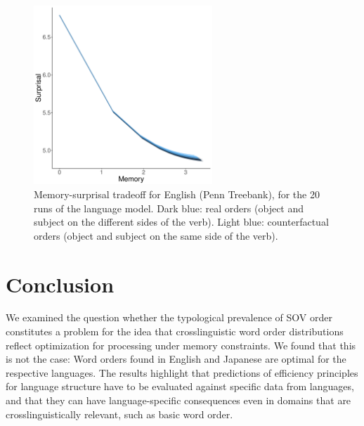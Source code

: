 \documentclass[11pt,a4paper]{article}
\begin{document}
\begin{figure}
    \centering
    \includegraphics[width=0.6\textwidth]{figures/ptb-memsurp.pdf}
\caption{Memory-surprisal tradeoff for English (Penn Treebank), for the 20 runs of the language model. Dark blue: real orders (object and subject on the different sides of the verb). Light blue: counterfactual orders (object and subject on the same side of the verb).}\label{fig:memsurp-ptb}
\end{figure}



\section{Conclusion}
We examined the question whether the typological prevalence of SOV order constitutes a problem for the idea that crosslinguistic word order distributions reflect optimization for processing under memory constraints.
We found that this is not the case: Word orders found in English and Japanese are optimal for the respective languages.
The results highlight that predictions of efficiency principles for language structure have to be evaluated against specific data from languages, and that they can have language-specific consequences even in domains that are crosslinguistically relevant, such as basic word order.



%
\end{document}
